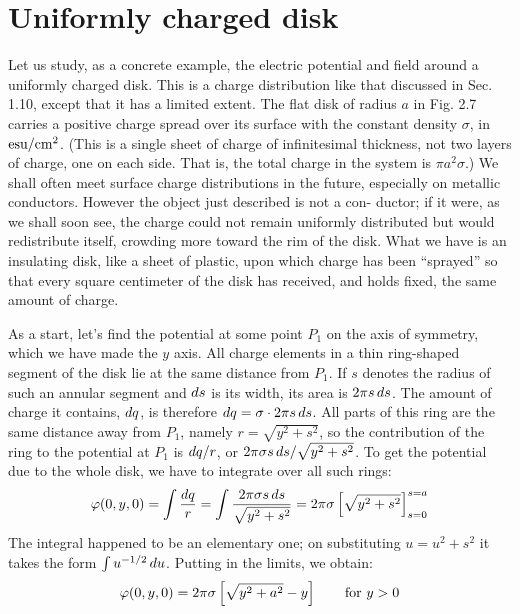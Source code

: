 \section{Uniformly charged disk}

Let us study, as a concrete example, the electric potential and field
around a uniformly charged disk. This is a charge distribution like
that discussed in Sec. 1.10, except that it has a limited extent. The
flat disk of radius $a$ in Fig. 2.7 carries a positive charge spread over its
surface with the constant density $\sigma$, in $\textup{esu}/\textup{cm}^2$. (This is a single sheet
of charge of infinitesimal thickness, not two layers of charge, one on
each side. That is, the total charge in the system is $\pi a^2\sigma$.) We shall
often meet surface charge distributions in the future, especially on
metallic conductors. However the object just described is not a con-
ductor; if it were, as we shall soon see, the charge could not remain
uniformly distributed but would redistribute itself, crowding more
toward the rim of the disk. What we have is an insulating disk, like
a sheet of plastic, upon which charge has been ``sprayed'' so that every
square centimeter of the disk has received, and holds fixed, the same
amount of charge.

As a start, let's find the potential at some point $P_1$ on the axis of
symmetry, which we have made the $y$ axis. All charge elements in a
thin ring-shaped segment of the disk lie at the same distance from $P_1$.
If $s$ denotes the radius of such an annular segment and $\mathop{d\!} s$ is its width,
its area is $2\pi s\mathop{d\!} s$. The amount of charge it contains, $\mathop{d\!} q$, is therefore 
$\mathop{d\!} q = \sigma\cdot 2\pi s \mathop{d\!} s$. All parts of this ring are the same distance away
from $P_1$, namely $r = \sqrt{y^2+s^2}$, so the contribution of the ring to the
potential at $P_1$ is $\mathop{d\!} q/r$, or $2\pi\sigma s\mathop{d\!} s/\sqrt{y^2+s^2}$. To get the potential
due to the whole disk, we have to integrate over all such rings:
\begin{equation}
  \varphi(0,y,0) = \int \frac{\mathop{d\!} q}{r} = \int \frac{2\pi\sigma s\mathop{d\!} s}{\sqrt{y^2+s^2}}
       =2\pi\sigma\left[\sqrt{y^2+s^2}\right]_{s=0}^{s=a}
\end{equation}
The integral happened to be an elementary one; on substituting
$u=u^2+s^2$ it takes the form $\int u^{-1/2}\mathop{d\!} u$. Putting in the limits, we
obtain:
\begin{equation}
  \varphi(0,y,0) = 2\pi\sigma\left[\sqrt{y^2+a^2}-y\right] \qquad \text{for $y>0$}
\end{equation}

